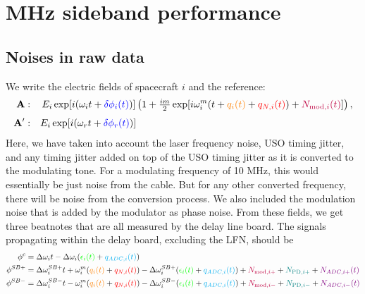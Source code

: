 \documentclass[11pt]{article}
\begin{document}

\section*{MHz sideband performance}
\subsection*{Noises in raw data}

We write the electric fields of spacecraft $i$ and the reference:
\begin{align*}
\mathbf{A}:&\quad\,E_{i}\exp[i(\omega_{i} t + {\color{blue}\delta\phi_{i}(t)})]
  \left(1 + \tfrac{im}{2}\exp[i\omega_{i}^m (t + {\color{orange}q_{i}(t)} + {\color{red}q_{N,i}(t)})+ {\color{purple}N_{\text{mod},i}(t)}]\right),
  \\[4pt]
\mathbf{A'}:&\quad
 E_{i}\exp[i(\omega_{r}t + {\color{blue}\delta\phi_{r}(t)})]
\end{align*}
Here, we have taken into account the laser frequency noise, USO timing jitter, and any timing jitter added on top of the USO timing jitter as it is converted to the modulating tone. For a modulating frequency of 10 MHz, this would essentially be just noise from the cable. But for any other converted frequency, there will be noise from the conversion process. We also included the modulation noise that is added by the modulator as phase noise. From these fields, we get three beatnotes that are all measured by the delay line board. The signals propagating within the delay board, excluding the LFN, should be
\begin{align*}
    \phi^{c}&=\Delta \omega_i t - \Delta \omega_i({\color{green}\epsilon_{i}(t)}+ {\color{cyan}q_{ADC,i}(t)}) \\
    \phi^{SB+}&=\Delta\omega_i^{SB+}t + \omega_i^{m}({\color{orange}q_{i}(t)} + {\color{red}q_{N,i}(t)})- \Delta \omega_i^{SB+}({\color{green}\epsilon_{i}(t)} + {\color{cyan}q_{ADC,i}(t)}) +  {\color{purple}N_{\text{mod},i+}} +  {\color{teal}N_{\text{PD},i+}}+ {\color{violet}N_{ADC,i+}(t)}\\
    \phi^{SB-}&=\Delta\omega_i^{SB-}t - \omega_i^{m}({\color{orange}q_{i}(t)} + {\color{red}q_{N,i}(t)}) -  \Delta\omega_i^{SB-}({\color{green}\epsilon_{i}(t)} + {\color{cyan}q_{ADC,i}(t)})+{\color{purple}N_{\text{mod},i-}} +  {\color{teal}N_{\text{PD},i-}}+ {\color{violet}N_{ADC,i-}(t)}
\end{align*}
\end{document}
